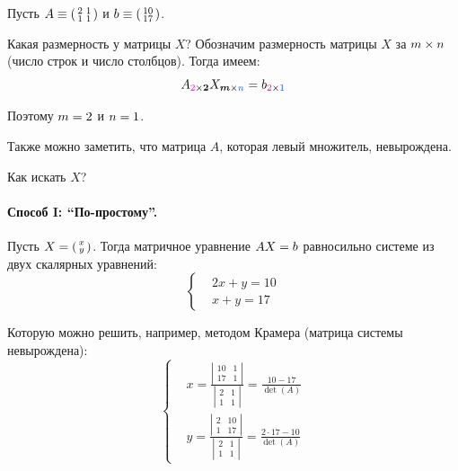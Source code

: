 \documentclass[a4paper,12pt]{article}
\begin{document}
  \begin{solution}
    Пусть $A \hm\equiv \left(\begin{smallmatrix}
      2 & 1\\
      1 & 1
    \end{smallmatrix}\right)$ и $b \hm\equiv \left(\begin{smallmatrix}
      10\\
      17
    \end{smallmatrix}\right)$.
    
    Какая размерность у матрицы $X$?
    Обозначим размерность матрицы $X$ за $m \hm\times n$ (число строк и число столбцов).
    Тогда имеем:
    \[
      A_{\textcolor{pink}{2} \times {\bds 2}} X_{{\bds m} \times \textcolor{blue}{n}} = b_{\textcolor{pink}{2} \times \textcolor{blue}{1}}
    \]
    
    Поэтому $m \hm= 2$ и $n \hm= 1$.
    
    Также можно заметить, что матрица $A$, которая левый множитель, невырождена.
    
    Как искать $X$?
    
    \bigskip
    
    \paragraph{Способ I: ``По-простому''.}
    
    Пусть $X \hm= \left(\begin{smallmatrix}x \\ y\end{smallmatrix}\right)$.
    Тогда матричное уравнение $AX \hm= b$ равносильно системе из двух скалярных уравнений:
    \[
      \left\{
        \begin{aligned}
          &2x + y = 10\\
          &x + y = 17
        \end{aligned}
      \right.
    \]
    
    Которую можно решить, например, методом Крамера (матрица системы невырождена):
    \[
      \left\{
        \begin{aligned}
          &x = \frac{\left|\begin{smallmatrix}10 & 1 \\ 17 & 1\end{smallmatrix}\right|}{\left|\begin{smallmatrix}2 & 1 \\ 1 & 1\end{smallmatrix}\right|} = \frac{10 - 17}{\det(A)}\\
          &y = \frac{\left|\begin{smallmatrix}2 & 10 \\ 1 & 17\end{smallmatrix}\right|}{\left|\begin{smallmatrix}2 & 1 \\ 1 & 1\end{smallmatrix}\right|} = \frac{2 \cdot 17 - 10}{\det(A)}
        \end{aligned}
      \right.
    \]
    

\end{solution}
\end{document}
